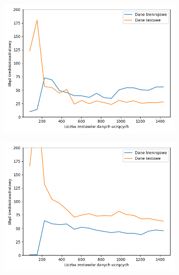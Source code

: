 \documentclass[12pt]{aghdpl}
\begin{document}
		\begin{figure}[h]
			\begin{subfigure}{.5\linewidth}
		 		\includegraphics[width =\linewidth]{wykresy/3_drugi_model_tworzenie_i_analiza/learning_curves.png}
		 	\end{subfigure}
		 	\begin{subfigure}{.5\linewidth}
		 		\includegraphics[width =\linewidth]{wykresy/4_zwiekszenie_stopnia_skomplikowania_modelu/1_warstwa_40_neuronow_learning_curves.png}
		 	\end{subfigure}
		 	

\end{figure}
\end{document}

